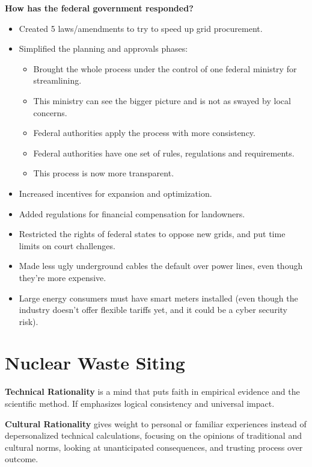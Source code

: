 \textbf{How has the federal government responded?}
\begin{itemize}
  \item Created 5 laws/amendments to try to speed up grid procurement.
  \item Simplified the planning and approvals phases:
    \begin{itemize}
      \item Brought the whole process under the control of one federal
        ministry for streamlining.
      \item This ministry can see the bigger picture and is not as
        swayed by local concerns.
      \item Federal authorities apply the process with more
        consistency.
      \item Federal authorities have one set of rules, regulations and
        requirements.
      \item This process is now more transparent.
    \end{itemize}
  \item Increased incentives for expansion and optimization.
  \item Added regulations for financial compensation for landowners.
  \item Restricted the rights of federal states to oppose new grids,
    and put time limits on court challenges.
  \item Made less ugly underground cables the default over power
    lines, even though they're more expensive.
  \item Large energy consumers must have smart meters installed (even
    though the industry doesn't offer flexible tariffs yet, and it
    could be a cyber security risk).
\end{itemize}

\section{Nuclear Waste Siting}

\textbf{Technical Rationality} is a mind that puts faith in empirical
evidence and the scientific method. If emphasizes logical consistency
and universal impact.

\textbf{Cultural Rationality} gives weight to personal or familiar
experiences instead of depersonalized technical calculations, focusing
on the opinions of traditional and cultural norms, looking at
unanticipated consequences, and trusting process over outcome.

